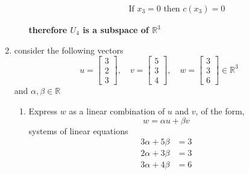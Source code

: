 \documentclass[11pt]{article}
\begin{document}
\begin{enumerate}
\begin{enumerate}
\begin{enumerate}
\[\begin{aligned}
            &\text{If } x_3 = 0 \text{ then } c(x_3) = 0
        \end{aligned}
        \]
    \end{enumerate}
    \textbf{therefore \( U_4 \) is a subspace of \( \mathbb{R}^3 \)}
\end{enumerate}
\item consider the following vectors \[
u = \begin{bmatrix}
3 \\
2 \\
3
\end{bmatrix}, \quad
v = \begin{bmatrix}
5 \\
3 \\
4
\end{bmatrix}, \quad
w = \begin{bmatrix}
3 \\
3 \\
6
\end{bmatrix} \in \mathbb{R}^3
\]
and
\(\alpha, \beta \in \mathbb{R}\)

\begin{enumerate}
    \item Express \( w \) as a linear combination of \( u \) and \( v \), of the form,
    \[ w = \alpha u + \beta v \]
systems of linear equations
\[
\begin{aligned}
    3\alpha + 5\beta &= 3 \\
    2\alpha + 3\beta &= 3 \\
    3\alpha + 4\beta &= 6
\end{aligned}
\]


\end{enumerate}
\end{enumerate}
\end{document}
